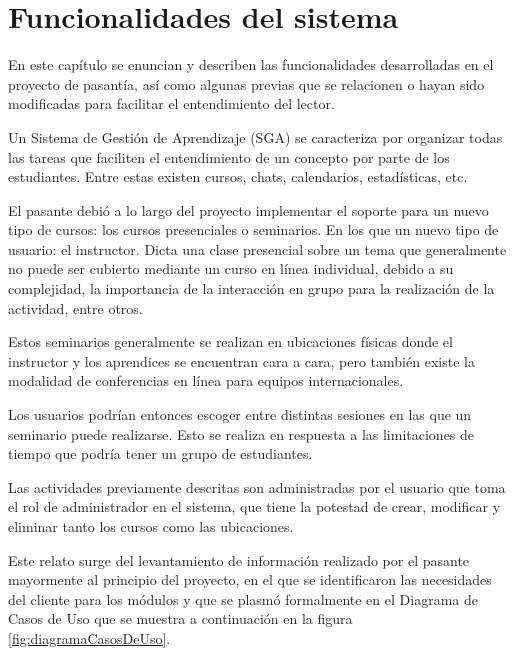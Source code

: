 ﻿\chapter{Funcionalidades del sistema}
\thispagestyle{empty} %

En este capítulo se enuncian y describen las funcionalidades desarrolladas en el proyecto de pasantía, así como algunas previas que se relacionen o hayan sido modificadas para facilitar el entendimiento del lector.

Un Sistema de Gestión de Aprendizaje (SGA) se caracteriza por organizar todas las tareas que faciliten el entendimiento de un concepto por parte de los estudiantes. Entre estas existen cursos, chats, calendarios, estadísticas, etc.

El pasante debió a lo largo del proyecto implementar el soporte para un nuevo tipo de cursos: los cursos presenciales o seminarios. En los que un nuevo tipo de usuario: el instructor. Dicta una clase presencial sobre un tema que generalmente no puede ser cubierto mediante un curso en línea individual, debido a su complejidad, la importancia de la interacción en grupo para la realización de la actividad, entre otros.

Estos seminarios generalmente se realizan en ubicaciones físicas donde el instructor y los aprendices se encuentran cara a cara, pero también existe la modalidad de conferencias en línea para equipos internacionales.

Los usuarios podrían entonces escoger entre distintas sesiones en las que un seminario puede realizarse. Esto se realiza en respuesta a las limitaciones de tiempo que podría tener un grupo de estudiantes.

Las actividades previamente descritas son administradas por el usuario que toma el rol de administrador en el sistema, que tiene la potestad de crear, modificar y eliminar tanto los cursos como las ubicaciones.

Este relato surge del levantamiento de información realizado por el pasante mayormente al principio del proyecto, en el que se identificaron las necesidades del cliente para los módulos y que se plasmó formalmente en el Diagrama de Casos de Uso que se muestra a continuación en la figura \ref{fig:diagramaCasosDeUso}.

